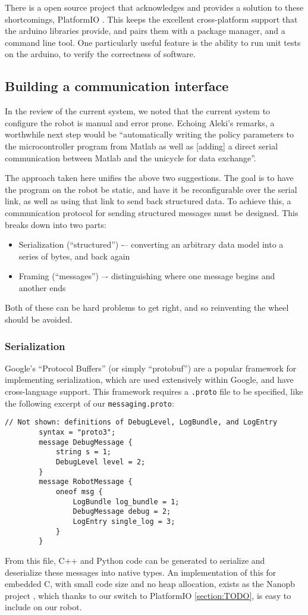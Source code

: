\documentclass[main.tex]{subfiles}
\begin{document}
	There is a open source project that acknowledges and provides a solution to these shortcomings, PlatformIO \cite{platformio}.
	This keeps the excellent cross-platform support that the arduino libraries provide, and pairs them with a package manager, and a command line tool.
	One particularly useful feature is the ability to run unit tests on the arduino, to verify the correctness of software.

\subsection{Building a communication interface}

	In the review of the current system, we noted that the current system to configure the robot is manual and error prone.
	Echoing Aleki's \cite[p.~34]{aleksi} remarks, a worthwhile next step would be \enquote{automatically writing the policy parameters to the microcontroller program from Matlab as well as [adding] a direct serial communication between Matlab and the unicycle for data exchange}.

	The approach taken here unifies the above two suggestions.
	The goal is to have the program on the robot be static, and have it be reconfigurable over the serial link, as well as using that link to send back structured data.
	To achieve this, a communication protocol for sending structured messages must be designed. This breaks down into two parts:
	\begin{itemize}[noitemsep]
		\item Serialization (\enquote{structured}) -– converting an arbitrary data model into a series of bytes, and back again
		\item Framing (\enquote{messages}) –- distinguishing where one message begins and another ends
	\end{itemize}
	Both of these can be hard problems to get right, and so reinventing the wheel should be avoided.

	\subsubsection{Serialization}
		Google’s \enquote{Protocol Buffers}\cite{protobuf} (or simply \enquote{protobuf}) are a popular framework for implementing serialization, which are used extensively within Google, and have cross-language support.
		This framework requires a \texttt{.proto} file to be specified, like the following excerpt of our \texttt{messaging.proto}:
		\begin{lstlisting}[gobble=4]
		// Not shown: definitions of DebugLevel, LogBundle, and LogEntry
		syntax = "proto3";
		message DebugMessage {
			string s = 1;
			DebugLevel level = 2;
		}
		message RobotMessage {
			oneof msg {
				LogBundle log_bundle = 1;
				DebugMessage debug = 2;
				LogEntry single_log = 3;
			}
		}
		\end{lstlisting}
		From this file, C++ and Python code can be generated to serialize and deserialize these messages into native types.
		An implementation of this for embedded C, with small code size and no heap allocation, exists as the Nanopb project \cite{nanopb}, which thanks to our switch to PlatformIO \cref{section:TODO}, is easy to include on our robot.
\end{document}
